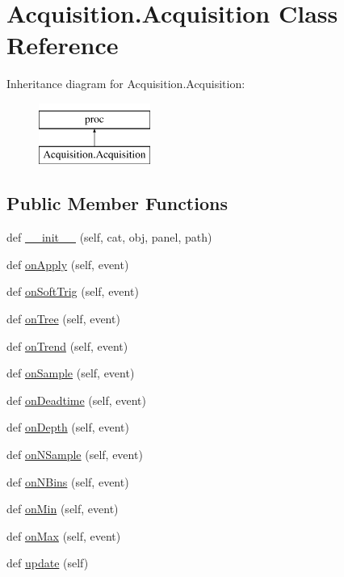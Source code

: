\hypertarget{classAcquisition_1_1Acquisition}{}\section{Acquisition.\+Acquisition Class Reference}
\label{classAcquisition_1_1Acquisition}
Inheritance diagram for Acquisition.\+Acquisition\+:\begin{figure}[H]
\begin{center}
\leavevmode
\includegraphics[height=2.000000cm]{classAcquisition_1_1Acquisition}
\end{center}
\end{figure}
\subsection*{Public Member Functions}
\begin{DoxyCompactItemize}
\item 
def \hyperlink{classAcquisition_1_1Acquisition_a2811edf47d59be70aeb9589a5e339893}{\+\_\+\+\_\+init\+\_\+\+\_\+} (self, cat, obj, panel, path)
\item 
def \hyperlink{classAcquisition_1_1Acquisition_ac7be703152b5ec0e02bc9c742d59cd50}{on\+Apply} (self, event)
\item 
def \hyperlink{classAcquisition_1_1Acquisition_aa686f47e8d19e10efa43c3330fd7d19b}{on\+Soft\+Trig} (self, event)
\item 
def \hyperlink{classAcquisition_1_1Acquisition_a9d82c40d0be476e1f4b9a8ec0f6ea29a}{on\+Tree} (self, event)
\item 
def \hyperlink{classAcquisition_1_1Acquisition_adde3ae2fd3eff1e113bd20651c8561a3}{on\+Trend} (self, event)
\item 
def \hyperlink{classAcquisition_1_1Acquisition_a37caf6d3a03c683c5fbcc079a2d8c7ec}{on\+Sample} (self, event)
\item 
def \hyperlink{classAcquisition_1_1Acquisition_aec0df3e0eea3f89f5c3057fac481be46}{on\+Deadtime} (self, event)
\item 
def \hyperlink{classAcquisition_1_1Acquisition_abd482f75a95cdcc9b55c5adb7c046ae3}{on\+Depth} (self, event)
\item 
def \hyperlink{classAcquisition_1_1Acquisition_ae0cfd44965bc1dd829cd6d6660cdd0ee}{on\+N\+Sample} (self, event)
\item 
def \hyperlink{classAcquisition_1_1Acquisition_a59fd4f2c9690f7745f346281ffe4f658}{on\+N\+Bins} (self, event)
\item 
def \hyperlink{classAcquisition_1_1Acquisition_aeb3c0ebfb598e5b1c03710574826108c}{on\+Min} (self, event)
\item 
def \hyperlink{classAcquisition_1_1Acquisition_ad744ff797e84b6e5f785c24d44144697}{on\+Max} (self, event)
\item 
def \hyperlink{classAcquisition_1_1Acquisition_abb09e973b83aec6cc4c660992b7dcc9d}{update} (self)
\end{DoxyCompactItemize}


